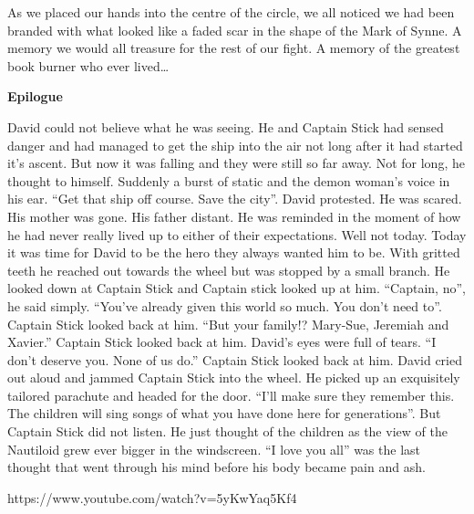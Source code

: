 As we placed our hands into the centre of the circle, we all noticed we had been branded with what looked like a faded scar in the shape of the Mark of Synne. A memory we would all treasure for the rest of our fight. A memory of the greatest book burner who ever lived…\medskip

\textbf{Epilogue}\medskip

David could not believe what he was seeing. He and Captain Stick had sensed danger and had managed to get the ship into the air not long after it had started it’s ascent. But now it was falling and they were still so far away. Not for long, he thought to himself. Suddenly a burst of static and the demon woman’s voice in his ear. “Get that ship off course. Save the city”. David protested. He was scared. His mother was gone. His father distant. He was reminded in the moment of how he had never really lived up to either of their expectations. Well not today. Today it was time for David to be the hero they always wanted him to be. With gritted teeth he reached out towards the wheel but was stopped by a small branch. He looked down at Captain Stick and Captain stick looked up at him. “Captain, no”, he said simply. “You’ve already given this world so much. You don’t need to”. Captain Stick looked back at him. “But your family!? Mary-Sue, Jeremiah and Xavier.” Captain Stick looked back at him. David’s eyes were full of tears. “I don’t deserve you. None of us do.” Captain Stick looked back at him. David cried out aloud and jammed Captain Stick into the wheel. He picked up an exquisitely tailored parachute and headed for the door. “I’ll make sure they remember this. The children will sing songs of what you have done here for generations”. But Captain Stick did not listen. He just thought of the children as the view of the Nautiloid grew ever bigger in the windscreen. “I love you all” was the last thought that went through his mind before his body became pain and ash.\medskip

https://www.youtube.com/watch?v=5yKwYaq5Kf4\medskip

\vspace*{5mm}
